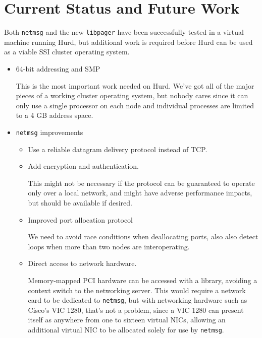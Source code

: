 \documentclass{article}
\def\libpager{{\tt libpager}\xspace}
\def\netmsg{{\tt netmsg}\xspace}
\begin{document}
\section{Current Status and Future Work}

Both \netmsg and the new \libpager have been successfully
tested in a virtual machine running Hurd, but additional work is
required before Hurd can be used as a viable SSI cluster operating
system.

\begin{itemize}

\item 64-bit addressing and SMP

This is the most important work needed on Hurd.  We've got all of the
major pieces of a working cluster operating system, but nobody cares
since it can only use a single processor on each node and individual
processes are limited to a 4 GB address space.

\item \netmsg improvements

\begin{itemize}

\item Use a reliable datagram delivery protocol instead of TCP.

\item Add encryption and authentication.

This might not be necessary if the protocol can be guaranteed to
operate only over a local network, and might have adverse performance
impacts, but should be available if desired.

\item Improved port allocation protocol

We need to avoid race conditions when deallocating ports, also also
detect loops when more than two nodes are interoperating.

\item Direct access to network hardware.

Memory-mapped PCI hardware can be accessed with a library, avoiding a
context switch to the networking server.  This would require a network
card to be dedicated to \netmsg, but with networking hardware such as
Cisco's VIC 1280, that's not a problem, since a VIC 1280 can
present itself as anywhere from one to sixteen virtual NICs, allowing
an additional virtual NIC to be allocated solely for use by \netmsg.

\end{itemize}


\end{itemize}
\end{document}
